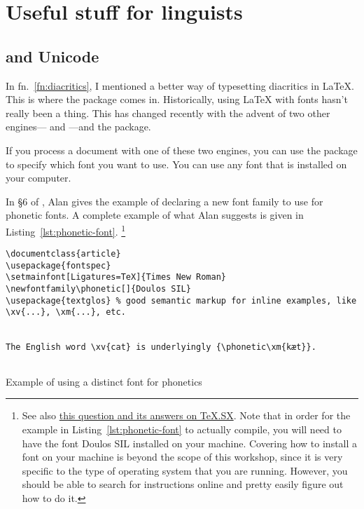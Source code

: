 
\section{Useful stuff for linguists}
\label{sec:useful-stuff-for-linguists}

\subsection{ and Unicode}
\label{subsec:fontspec-and-unicode}

In fn.~\ref{fn:diacritics}, I mentioned a better way of typesetting diacritics in \LaTeX.
This is where the  package comes in.
Historically, using \LaTeX{} with fonts hasn't really been a thing.
This has changed recently with the advent of two other engines--- and ---and the  package.

If you process a document with one of these two engines, you can use the  package to specify which font you want to use.
You can use any font that is installed on your computer.

In \S6 of , Alan gives the example of declaring a new font family to use for phonetic fonts.
A complete example of what Alan suggests is given in Listing~\ref{lst:phonetic-font}.%
\footnote{%
See also \href{http://tex.stackexchange.com/q/25249/32888}{this question and its answers on TeX.SX}.
Note that in order for the example in Listing~\ref{lst:phonetic-font} to actually compile, you will need to have the font Doulos SIL installed on your machine.
Covering how to install a font on your machine is beyond the scope of this workshop, since it is very specific to the type of operating system that you are running.
However, you should be able to search for instructions online and pretty easily figure out how to do it.%
}

\begin{listing}[htbp]
	\centering
	\begin{verbatim}
\documentclass{article}
\usepackage{fontspec}
\setmainfont[Ligatures=TeX]{Times New Roman}
\newfontfamily\phonetic[]{Doulos SIL}
\usepackage{textglos} % good semantic markup for inline examples, like \xv{...}, \xm{...}, etc.


The English word \xv{cat} is underlyingly {\phonetic\xm{kæt}}.


	\end{verbatim}
	\caption{Example of using a distinct font for phonetics}
	\label{lst:phonetic-font}
\end{listing}

